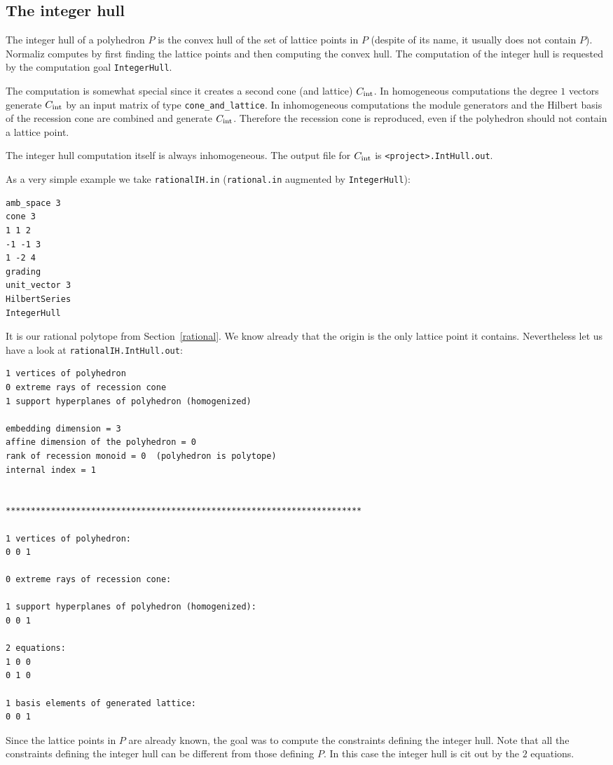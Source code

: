 \documentclass[12pt,a4paper]{scrartcl}
\theoremstyle{definition}
\begin{document}
\subsection{The integer hull}\label{IntHull}

The integer hull of a polyhedron $P$ is the convex hull of the set of lattice points in $P$ (despite of its name, it usually does not contain $P$). Normaliz computes by first finding the lattice points and then computing the convex hull. The computation of the integer hull is requested by the computation goal \verb|IntegerHull|.

The computation is somewhat special since it creates a second cone (and lattice) $C_\textup{int}$. In homogeneous computations the degree $1$ vectors generate $C_\textup{int}$ by an input matrix of type \verb|cone_and_lattice|. In inhomogeneous computations the module generators and the Hilbert basis of the recession cone are combined and generate $C_\textup{int}$. Therefore the recession cone is reproduced, even if the polyhedron should not contain a lattice point.

The integer hull computation itself is always inhomogeneous. The output file for $C_\textup{int}$ is \verb|<project>.IntHull.out|.

As a very simple example we take \verb|rationalIH.in| (\verb|rational.in| augmented by \verb|IntegerHull|):
\begin{Verbatim}
amb_space 3
cone 3
1 1 2
-1 -1 3
1 -2 4
grading
unit_vector 3
HilbertSeries
IntegerHull
\end{Verbatim}
It is our rational polytope from Section~\ref{rational}. We know already that the origin is the only lattice point it contains. Nevertheless let us have a look at \verb|rationalIH.IntHull.out|:

\begin{Verbatim}
1 vertices of polyhedron
0 extreme rays of recession cone
1 support hyperplanes of polyhedron (homogenized)

embedding dimension = 3
affine dimension of the polyhedron = 0
rank of recession monoid = 0  (polyhedron is polytope)
internal index = 1


***********************************************************************

1 vertices of polyhedron:
0 0 1

0 extreme rays of recession cone:

1 support hyperplanes of polyhedron (homogenized):
0 0 1

2 equations:
1 0 0
0 1 0

1 basis elements of generated lattice:
0 0 1
\end{Verbatim}
Since the lattice points in $P$ are already known, the goal was to compute the constraints defining the integer hull. Note that all the constraints defining the integer hull can be different from those defining $P$. In this case the integer hull is cit out by the $2$ equations.
\end{document}
